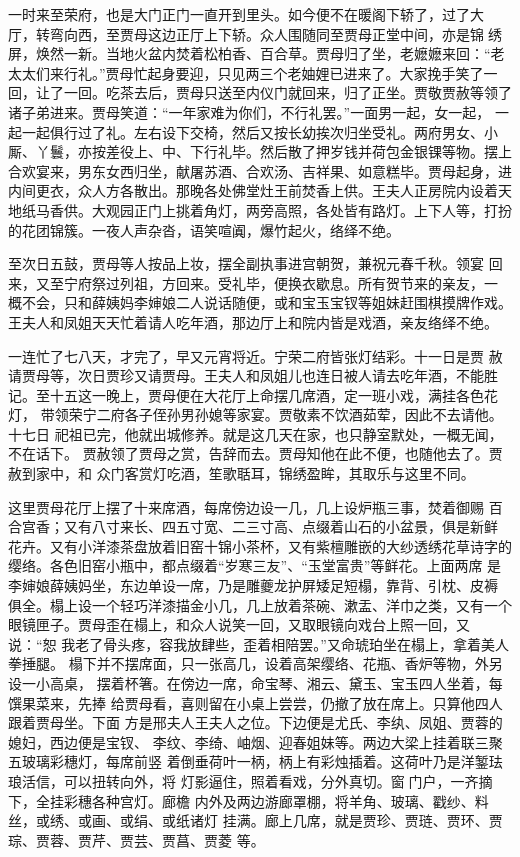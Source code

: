 一时来至荣府，也是大门正门一直开到里头。如今便不在暖阁下轿了，过了大
厅，转弯向西，至贾母这边正厅上下轿。众人围随同至贾母正堂中间，亦是锦绣
屏，焕然一新。当地火盆内焚着松柏香、百合草。贾母归了坐，老嬷嬷来回：“老
太太们来行礼。”贾母忙起身要迎，只见两三个老妯娌已进来了。大家挽手笑了一
回，让了一回。吃茶去后，贾母只送至内仪门就回来，归了正坐。贾敬贾赦等领了
诸子弟进来。贾母笑道：“一年家难为你们，不行礼罢。”一面男一起，女一起，
一起一起俱行过了礼。左右设下交椅，然后又按长幼挨次归坐受礼。两府男女、小
厮、丫鬟，亦按差役上、中、下行礼毕。然后散了押岁钱并荷包金银锞等物。摆上
合欢宴来，男东女西归坐，献屠苏酒、合欢汤、吉祥果、如意糕毕。贾母起身，进
内间更衣，众人方各散出。那晚各处佛堂灶王前焚香上供。王夫人正房院内设着天
地纸马香供。大观园正门上挑着角灯，两旁高照，各处皆有路灯。上下人等，打扮
的花团锦簇。一夜人声杂沓，语笑喧阗，爆竹起火，络绎不绝。

至次日五鼓，贾母等人按品上妆，摆全副执事进宫朝贺，兼祝元春千秋。领宴
回来，又至宁府祭过列祖，方回来。受礼毕，便换衣歇息。所有贺节来的亲友，一
概不会，只和薛姨妈李婶娘二人说话随便，或和宝玉宝钗等姐妹赶围棋摸牌作戏。
王夫人和凤姐天天忙着请人吃年酒，那边厅上和院内皆是戏酒，亲友络绎不绝。

一连忙了七八天，才完了，早又元宵将近。宁荣二府皆张灯结彩。十一日是贾
赦请贾母等，次日贾珍又请贾母。王夫人和凤姐儿也连日被人请去吃年酒，不能胜
记。至十五这一晚上，贾母便在大花厅上命摆几席酒，定一班小戏，满挂各色花灯，
带领荣宁二府各子侄孙男孙媳等家宴。贾敬素不饮酒茹荤，因此不去请他。十七日
祀祖已完，他就出城修养。就是这几天在家，也只静室默处，一概无闻，不在话下。
贾赦领了贾母之赏，告辞而去。贾母知他在此不便，也随他去了。贾赦到家中，和
众门客赏灯吃酒，笙歌聒耳，锦绣盈眸，其取乐与这里不同。

这里贾母花厅上摆了十来席酒，每席傍边设一几，几上设炉瓶三事，焚着御赐
百合宫香；又有八寸来长、四五寸宽、二三寸高、点缀着山石的小盆景，俱是新鲜
花卉。又有小洋漆茶盘放着旧窑十锦小茶杯，又有紫檀雕嵌的大纱透绣花草诗字的
缨络。各色旧窑小瓶中，都点缀着“岁寒三友”、“玉堂富贵”等鲜花。上面两席
是李婶娘薛姨妈坐，东边单设一席，乃是雕夔龙护屏矮足短榻，靠背、引枕、皮褥
俱全。榻上设一个轻巧洋漆描金小几，几上放着茶碗、漱盂、洋巾之类，又有一个
眼镜匣子。贾母歪在榻上，和众人说笑一回，又取眼镜向戏台上照一回，又说：“恕
我老了骨头疼，容我放肆些，歪着相陪罢。”又命琥珀坐在榻上，拿着美人拳捶腿。
榻下并不摆席面，只一张高几，设着高架缨络、花瓶、香炉等物，外另设一小高桌，
摆着杯箸。在傍边一席，命宝琴、湘云、黛玉、宝玉四人坐着，每馔果菜来，先捧
给贾母看，喜则留在小桌上尝尝，仍撤了放在席上。只算他四人跟着贾母坐。下面
方是邢夫人王夫人之位。下边便是尤氏、李纨、凤姐、贾蓉的媳妇，西边便是宝钗、
李纹、李绮、岫烟、迎春姐妹等。两边大梁上挂着联三聚五玻璃彩穗灯，每席前竖
着倒垂荷叶一柄，柄上有彩烛插着。这荷叶乃是洋錾珐琅活信，可以扭转向外，将
灯影逼住，照着看戏，分外真切。窗门户，一齐摘下，全挂彩穗各种宫灯。廊檐
内外及两边游廊罩棚，将羊角、玻璃、戳纱、料丝，或绣、或画、或绢、或纸诸灯
挂满。廊上几席，就是贾珍、贾琏、贾环、贾琮、贾蓉、贾芹、贾芸、贾菖、贾菱
等。

